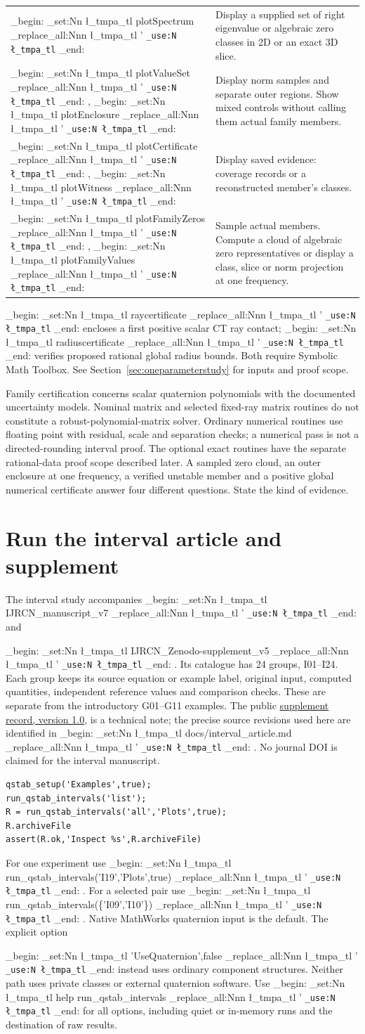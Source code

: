 \documentclass[11pt,a4paper]{article}
\newcommand{\m}[1]{
  \group_begin:
  \tl_set:Nn \l_tmpa_tl {#1}
  \tl_replace_all:Nnn \l_tmpa_tl {'}{\textquotesingle{}}
  \texttt{\tl_use:N \l_tmpa_tl}
  \group_end:
}
\newcommand{\lead}[1]{\par\smallskip\noindent{\sffamily\bfseries\color{teal}#1}\enspace}
\newcommand{\topic}[2]{\clearpage\section{#1}\label{#2}}
\begin{document}
\begin{tabularx}{\linewidth}{@{}>{\raggedright\arraybackslash}p{.30\linewidth}Y@{}}
\m{plotSpectrum} & Display a supplied set of right eigenvalue or algebraic zero classes in 2D or an exact 3D slice.\\
\m{plotValueSet}, \m{plotEnclosure} & Display norm samples and separate outer regions. Show mixed controls without calling them actual family members.\\
\m{plotCertificate}, \m{plotWitness} & Display saved evidence: coverage records or a reconstructed member's classes.\\
\m{plotFamilyZeros}, \m{plotFamilyValues} & Sample actual members. Compute a cloud of algebraic zero representatives or display a class, slice or norm projection at one frequency.\\\bottomrule
\end{tabularx}\par\smallskip
\lead{Optional exact operations} \m{raycertificate} encloses a first positive scalar CT ray contact; \m{radiuscertificate} verifies proposed rational global radius bounds. Both require Symbolic Math Toolbox. See Section~\ref{sec:oneparameterstudy} for inputs and proof scope.

\lead{Where the present release stops} Family certification concerns scalar quaternion polynomials with the documented uncertainty models. Nominal matrix and selected fixed-ray matrix routines do not constitute a robust-polynomial-matrix solver. Ordinary numerical routines use floating point with residual, scale and separation checks; a numerical pass is not a directed-rounding interval proof. The optional exact routines have the separate rational-data proof scope described later. A sampled zero cloud, an outer enclosure at one frequency, a verified unstable member and a positive global numerical certificate answer four different questions. State the kind of evidence.
\topic{Run the interval article and supplement}{sec:intervalstudy}
The interval study accompanies \m{IJRCN\_manuscript\_v7} and
\m{IJRCN\_Zenodo-supplement\_v5}. Its catalogue has 24 groups, I01--I24.
Each group keeps its source equation or example label, original input,
computed quantities, independent reference values and comparison checks.
These are separate from the introductory G01--G11 examples. The public
\href{https://doi.org/10.5281/zenodo.24389775}{supplement record, version 1.0},
is a technical note; the precise source revisions used here are identified
in \m{docs/interval\_article.md}. No journal DOI is claimed for the interval
manuscript.
\begin{lstlisting}
qstab_setup('Examples',true);
run_qstab_intervals('list');
R = run_qstab_intervals('all','Plots',true);
R.archiveFile
assert(R.ok,'Inspect %s',R.archiveFile)
\end{lstlisting}
For one experiment use \m{run\_qstab\_intervals('I19','Plots',true)}.
For a selected pair use \m{run\_qstab\_intervals(\{'I09','I10'\})}.
Native MathWorks quaternion input is the default. The explicit option
\m{'UseQuaternion',false} instead uses ordinary component structures.
Neither path uses private classes or external quaternion software.
Use \m{help run\_qstab\_intervals} for all options, including quiet or
in-memory runs and the destination of raw results.
\end{document}
